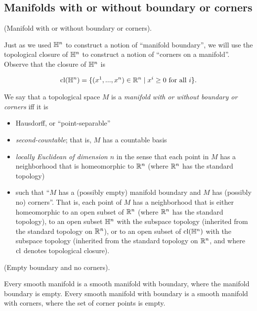     

\subsection*{Manifolds with or without boundary or corners}

\begin{defn}
     (Manifold with or without boundary or corners).
        
    Just as we used $\mathbb{H}^n$ to construct a notion of ``manifold boundary'', we will use the topological closure of $\mathbb{H}^n$ to construct a notion of ``corners on a manifold''. Observe that the closure of $\mathbb{H}^n$ is
        
    \begin{align*}
        \text{cl}(\mathbb{H}^n) = \{(x^1, ..., x^n) \in \mathbb{R}^n \mid x^i \geq 0 \text{ for all $i$} \}.
    \end{align*}
    
    We say that a topological space $M$ is a \textit{manifold with or without boundary or corners} iff it is
    
    \begin{itemize}
        \item Hausdorff, or ``point-separable''
        \item \textit{second-countable}; that is, $M$ has a countable basis
        \item \textit{locally Euclidean of dimension $n$} in the sense that each point in $M$ has a neighborhood that is homeomorphic to $\mathbb{R}^n$ (where $\mathbb{R}^n$ has the standard topology)
        \item such that ``$M$ has a (possibly empty) manifold boundary and $M$ has (possibly no) corners''. That is, each point of $M$ has a neighborhood that is either homeomorphic to an open subset of $\mathbb{R}^n$ (where $\mathbb{R}^n$ has the standard topology), to an open subset $\mathbb{H}^n$ with the subspace topology (inherited from the standard topology on $\mathbb{R}^n$), or to an open subset of $\text{cl}(\mathbb{H}^n)$ with the subspace topology (inherited from the standard topology on $\mathbb{R}^n$, and where $\text{cl}$ denotes topological closure).
    \end{itemize}
\end{defn}

\begin{remark}
     (Empty boundary and no corners).
    
    Every smooth manifold is a smooth manifold with boundary, where the manifold boundary is empty. Every smooth manifold with boundary is a smooth manifold with corners, where the set of corner points is empty.
\end{remark}

